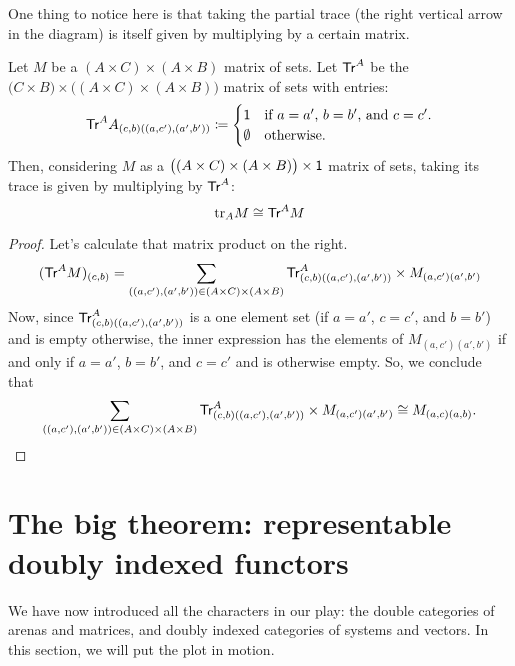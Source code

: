 \documentclass[DynamicalBook]{subfiles}
\begin{document}
One thing to notice here is that taking the partial trace (the right vertical
arrow in the diagram) is itself given by multiplying by a certain matrix.
\begin{proposition}\label{prop.trace_multiplying_by_matrix}
  Let $M$ be a $(A \times C) \times (A \times B)$ matrix of sets. Let
  $\mathsf{Tr}^A$ be the $\big(C \times B \big) \times \big((A \times C) \times (A
  \times B)\big)$ matrix of sets with entries:
  \[
    \mathsf{Tr}^A{A}_{(c, b)((a,c'),(a', b'))} \coloneqq \begin{cases} 
      \mathsf{1} &\mbox{if $a = a'$, $b = b'$, and $c = c'$.} \\
      \emptyset &\mbox{otherwise.}
    \end{cases} 
\]
  Then, considering $M$ as a $\big((A \times C) \times (A \times B)\big) \times
  \mathsf{1}$ matrix of sets, taking its trace is given by multiplying by $\mathsf{Tr}^A$:
$$\mathrm{tr}_{A}M \cong \mathsf{Tr}^A M$$
\end{proposition}
\begin{proof}
  Let's calculate that matrix product on the right.
  \begin{align*}
    (\mathsf{Tr}^A M)_{(c, b)} &= \sum_{((a, c'), (a', b')) \in (A \times C) \times (A \times B)} \mathsf{Tr}^A_{(c,b)((a, c'),(a', b'))} \times M_{(a,c')(a',b')} \\
  \end{align*}
  Now, since $\mathsf{Tr}^A_{(c,b)((a,c'),(a',b'))}$ is a one element set (if $a =
  a'$, $c = c'$, and $b = b'$) and is empty otherwise, the inner expression has
  the elements of $M_{(a,c')(a', b')}$ if and only if $a = a'$, $b = b'$, and $c
  = c'$ and is otherwise empty. So, we conclude that
  \[
\sum_{((a, c'), (a', b')) \in (A \times C) \times (A \times B)}
\mathsf{Tr}^A_{(c,b)((a, c'),(a', b'))} \times M_{(a,c')(a',b')} \cong M_{(a, c)(a,
  b)}.\qedhere
\]
\end{proof}








\section{The big theorem: representable doubly indexed functors}

We have now introduced all the characters in our play: the double categories of
arenas and matrices, and doubly indexed categories of systems and vectors. In
this section, we will put the plot in motion. 
\end{document}
